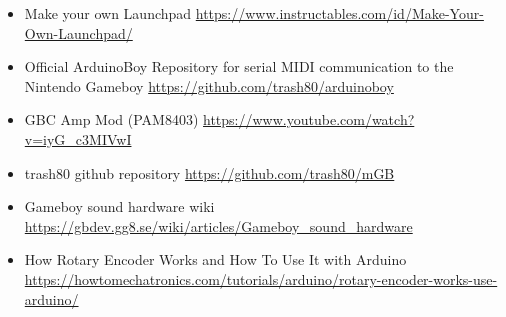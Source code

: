 \documentclass{article}
\begin{document}
\begin{itemize}

        \item Make your own Launchpad
                \url{https://www.instructables.com/id/Make-Your-Own-Launchpad/}

        \item Official ArduinoBoy Repository for serial MIDI communication to the Nintendo Gameboy 
                \url{https://github.com/trash80/arduinoboy}

        \item GBC Amp Mod (PAM8403)
                \url{https://www.youtube.com/watch?v=iyG_c3MIVwI}

        \item trash80 github repository 
                \url{https://github.com/trash80/mGB }
            
        \item Gameboy sound hardware wiki
                \url{https://gbdev.gg8.se/wiki/articles/Gameboy_sound_hardware}

        \item How Rotary Encoder Works and How To Use It with Arduino
                \url{https://howtomechatronics.com/tutorials/arduino/rotary-encoder-works-use-arduino/}
    
\end{itemize}
\end{document}
